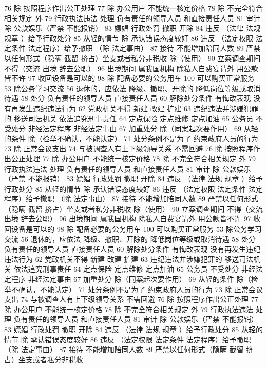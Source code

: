 \documentclass[11pt]{ctexart}
\begin{document}
76 除 按照程序作出公正处理
77 除 办公用户
不能统一核定价格
78 除 不完全符合相关规定 外
79 行政执法违法 处理
负有责任的领导人员
和直接责任人员
81 审计
除 公款娱乐（严禁 不能报销）
83 嫖娼 行政处罚
撤职 开除
84 违反 （法律 法规 规章 ）给予行政处分
85 从轻的情节
除 承认错误态度较好
86 违反 （法定权限 法定条件 法定程序）给予撤职
（除 法定事由）
87 接待 不能增加陪同人数
89 严禁以任何形式（隐瞒 截留 挤占）坐支或者私分非税收
除（使用）
90 立案调查期间 不得（交流 出境 辞去公职）
96 出境期间 属我国机构 除私人自费宴请外 用公款皆不许
97 收回设备是可以的
98 除 配备必要的公务用车
100 可以购买正常服务
53 除公务学习交流
56 退休的，应依法
降级、撤职、开除的 降低岗位等级或取消待遇
58 处分
负有责任的领导人员
直接责任人员
60 解除处分条件
有悔改表现
没有再发生违纪违法行为
62 党政机关不得
新建 改建 扩建
63 违纪违法并涉嫌犯罪的
移送司法机关
依法追究刑事责任
64 定点保险 定点维修 定点加油
65 公务员 不受处分
非经法定程序
非经法定事由
67 加重处分
除（同案起次要作用）
69 从轻的条件
除（检举不确认，不能认定）
71 处分条例不是为了
约束政府人员的行为
73 除 正常会议支出
74 与被调查人有上下级领导关系 不需回避
76 除 按照程序作出公正处理
77 除 办公用户
不能统一核定价格
78 除 不完全符合相关规定 外
79 行政执法违法 处理
负有责任的领导人员
和直接责任人员
81 审计
除 公款娱乐（严禁 不能报销）
83 嫖娼 行政处罚
撤职 开除
84 违反 （法律 法规 规章 ）给予行政处分
85 从轻的情节
除 承认错误态度较好
86 违反 （法定权限 法定条件 法定程序）给予撤职
（除 法定事由）
87 接待 不能增加陪同人数
89 严禁以任何形式（隐瞒 截留 挤占）坐支或者私分非税收
除（使用）
90 立案调查期间 不得（交流 出境 辞去公职）
96 出境期间 属我国机构 除私人自费宴请外 用公款皆不许
97 收回设备是可以的
98 除 配备必要的公务用车
100 可以购买正常服务
53 除公务学习交流
56 退休的，应依法
降级、撤职、开除的 降低岗位等级或取消待遇
58 处分
负有责任的领导人员
直接责任人员
60 解除处分条件
有悔改表现
没有再发生违纪违法行为
62 党政机关不得
新建 改建 扩建
63 违纪违法并涉嫌犯罪的
移送司法机关
依法追究刑事责任
64 定点保险 定点维修 定点加油
65 公务员 不受处分
非经法定程序
非经法定事由
67 加重处分
除（同案起次要作用）
69 从轻的条件
除（检举不确认，不能认定）
71 处分条例不是为了
约束政府人员的行为
73 除 正常会议支出
74 与被调查人有上下级领导关系 不需回避
76 除 按照程序作出公正处理
77 除 办公用户
不能统一核定价格
78 除 不完全符合相关规定 外
79 行政执法违法 处理
负有责任的领导人员
和直接责任人员
81 审计
除 公款娱乐（严禁 不能报销）
83 嫖娼 行政处罚
撤职 开除
84 违反 （法律 法规 规章 ）给予行政处分
85 从轻的情节
除 承认错误态度较好
86 违反 （法定权限 法定条件 法定程序）给予撤职
（除 法定事由）
87 接待 不能增加陪同人数
89 严禁以任何形式（隐瞒 截留 挤占）坐支或者私分非税收
\end{document}
